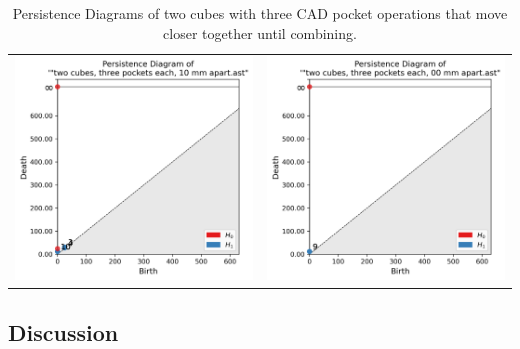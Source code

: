 \documentclass[ma]{uncgdissertationexp}
\theoremstyle{plain}
\theoremstyle{definition}
\theoremstyle{remark}
\begin{document}
\begin{table}[H]
\begin{center}
\begin{tabular}{cc}
         \includegraphics[width=2.5in]{Final Run, (two cubes, three pockets each, 10 mm apart) persdia.png} & 
         \includegraphics[width=2.5in]{Final Run, (two cubes, three pockets each, 00 mm apart) persdia.png} \\
\end{tabular}
\end{center}
    \caption{Persistence Diagrams of two cubes with three CAD pocket operations that move closer together until combining.}
    \label{fig:cube_two_cubes_persdia_table}
\end{table}

\subsection{Discussion}


\newpage
\end{document}

